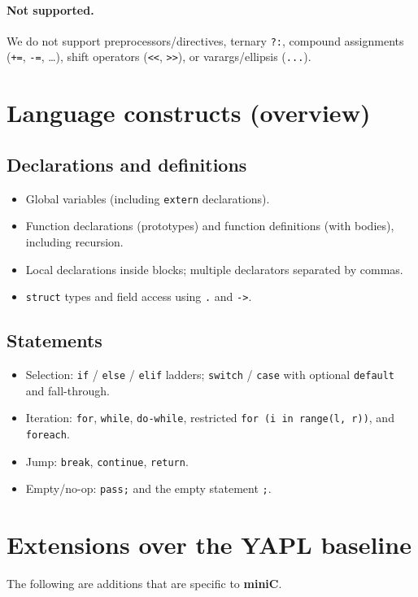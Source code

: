 \documentclass[11pt]{article}
\newcommand{\lang}{\textbf{miniC}}
\begin{document}
\paragraph{Not supported.}
We do not support preprocessors/directives, ternary \texttt{?:}, compound assignments (\texttt{+=}, \texttt{-=}, \dots), shift operators (\texttt{<<}, \texttt{>>}), or varargs/ellipsis (\texttt{...}).

\section{Language constructs (overview)}
\subsection*{Declarations and definitions}
\begin{itemize}
	\item Global variables (including \texttt{extern} declarations).
	\item Function declarations (prototypes) and function definitions (with bodies), including recursion.
	\item Local declarations inside blocks; multiple declarators separated by commas.
	\item \texttt{struct} types and field access using \texttt{.} and \texttt{->}.
\end{itemize}

\subsection*{Statements}
\begin{itemize}
	\item Selection: \texttt{if} / \texttt{else} / \texttt{elif} ladders; \texttt{switch} / \texttt{case} with optional \texttt{default} and fall-through.
	\item Iteration: \texttt{for}, \texttt{while}, \texttt{do-while}, restricted \texttt{for (i in range(l, r))}, and \texttt{foreach}.
	\item Jump: \texttt{break}, \texttt{continue}, \texttt{return}.
	\item Empty/no-op: \texttt{pass;} and the empty statement \texttt{;}.
\end{itemize}

\section{Extensions over the YAPL baseline}
\label{sec:extensions}
The following are additions that are specific to \lang{}.
\end{document}
